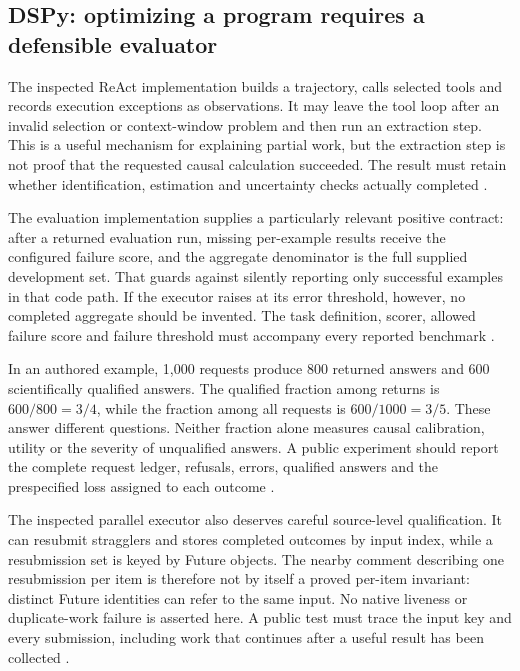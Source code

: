 \subsection{DSPy: optimizing a program requires a defensible evaluator}
The inspected ReAct implementation builds a trajectory, calls selected
tools and records execution exceptions as observations. It may leave the
tool loop after an invalid selection or context-window problem and then
run an extraction step. This is a useful mechanism for explaining partial
work, but the extraction step is not proof that the requested causal
calculation succeeded. The result must retain whether identification,
estimation and uncertainty checks actually completed
\cite{exec24_framework_dspy}.

The evaluation implementation supplies a particularly relevant positive
contract: after a returned evaluation run, missing per-example results
receive the configured failure score, and the aggregate denominator is
the full supplied development set. That guards against silently reporting
only successful examples in that code path. If the executor raises at
its error threshold, however, no completed aggregate should be invented.
The task definition, scorer, allowed failure score and failure threshold
must accompany every reported benchmark
\cite{exec24_framework_dspy}.

In an authored example, 1,000 requests produce 800 returned answers and
600 scientifically qualified answers. The qualified fraction among
returns is $600/800=3/4$, while the fraction among all requests is
$600/1000=3/5$. These answer different questions. Neither fraction alone
measures causal calibration, utility or the severity of unqualified
answers. A public experiment should report the complete request ledger,
refusals, errors, qualified answers and the prespecified loss assigned to
each outcome \cite{exec24_framework_contracts}.

The inspected parallel executor also deserves careful source-level
qualification. It can resubmit stragglers and stores completed outcomes
by input index, while a resubmission set is keyed by Future objects.
The nearby comment describing one resubmission per item is therefore not
by itself a proved per-item invariant: distinct Future identities can
refer to the same input. No native liveness or duplicate-work failure is
asserted here. A public test must trace the input key and every submission,
including work that continues after a useful result has been collected
\cite{exec24_framework_dspy,exec24_framework_contracts}.

